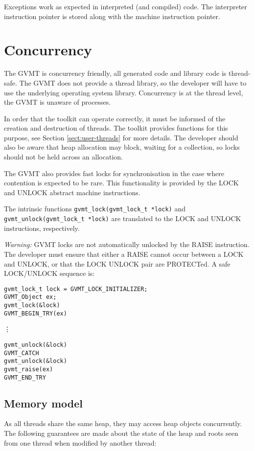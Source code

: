 Exceptions work as expected in interpreted (and compiled) code. The interpreter instruction pointer is stored along with the machine instruction pointer.

\section{Concurrency\label{sect:conc}}

The GVMT is concurrency friendly, all generated code and library code is thread-safe. The GVMT does not provide a thread library, so the developer will have to use the underlying operating system library.
Concurrency is at the thread level, the GVMT is unaware of processes.

In order that the toolkit can operate correctly, it must be informed of the creation and destruction of threads.
The toolkit provides functions for this purpose, see Section \ref{sect:user-threads} for more details.
The developer should also be aware that heap allocation may block, waiting for a collection, so locks should not be held across an allocation.

The GVMT also provides fast locks for synchronisation in the case where contention is expected to be rare. This functionality is provided by the  LOCK and UNLOCK abstract machine instructions. 

The intrinsic functions \verb|gvmt_lock(gvmt_lock_t *lock)| and \verb|gvmt_unlock(gvmt_lock_t *lock)| are translated to the LOCK and UNLOCK instructions, respectively.

\emph{Warning:} GVMT locks are not automatically unlocked by the RAISE instruction. The developer must ensure that either a RAISE cannot occur between a LOCK and UNLOCK, or that the LOCK UNLOCK pair are PROTECTed. A safe LOCK/UNLOCK sequence is:
\begin{verbatim}
gvmt_lock_t lock = GVMT_LOCK_INITIALIZER;
GVMT_Object ex;
gvmt_lock(&lock)
GVMT_BEGIN_TRY(ex)
\end{verbatim}
\nopagebreak[4]
        \vdots
\nopagebreak[4]
\begin{verbatim}
gvmt_unlock(&lock)
GVMT_CATCH
gvmt_unlock(&lock)
gvmt_raise(ex)
GVMT_END_TRY
\end{verbatim}

\subsection{Memory model}
As all threads share the same heap, they may access heap objects concurrently. The following guarantees are made about the state of the heap and roots seen from one thread when modified by another thread:

